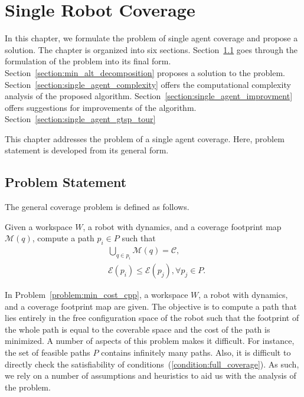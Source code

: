 \documentclass[../main.tex]{subfiles}
\begin{document}
\chapter{Single Robot Coverage}
\label{chapter:single_robot_coverage}

In this chapter, we formulate the problem of single agent coverage and propose a solution. The chapter is organized into six sections. Section~\ref{section:single_problem_statement} goes through the formulation of the problem into its final form. Section~\ref{section:min_alt_decomposition} proposes a solution to the problem. Section~\ref{section:single_agent_complexity} offers the computational complexity analysis of the proposed algorithm. Section~\ref{section:single_agent_improvment} offers suggestions for improvements of the algorithm. Section~\ref{section:single_agent_gtsp_tour} 

This chapter addresses the problem of a single agent coverage. Here, problem statement is developed from its general form.

\section{Problem Statement}
\label{section:single_problem_statement}

The general coverage problem is defined as follows.
\begin{problem}
\label{problem:min_cost_cpp}
	Given a workspace $W$, a robot with dynamics, and a coverage footprint map $\mathcal{M}(q)$, compute a path $p_i\in P$ such that
	\begin{equation}
	\label{condition:full_coverage}
	\begin{aligned}
		& \bigcup_{q\in p_i}\mathcal{M}(q)=\mathcal{C},\\
		& \mathcal{E}(p_i)\leq\mathcal{E}(p_j), \forall p_j\in P.
	\end{aligned}
	\end{equation}
\end{problem}

In Problem~\ref{problem:min_cost_cpp}, a workspace $W$, a robot with dynamics, and a coverage footprint map are given. The objective is to compute a path that lies entirely in the free configuration space of the robot such that the footprint of the whole path is equal to the coverable space and the cost of the path is minimized. A number of aspects of this problem makes it difficult. For instance, the set of feasible paths $P$ contains infinitely many paths. Also, it is difficult to directly check the satisfiability of conditions~(\ref{condition:full_coverage}). As such, we rely on a number of assumptions and heuristics to aid us with the analysis of the problem.
\end{document}
